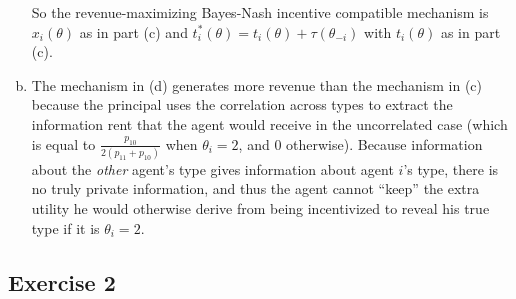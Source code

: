 \documentclass{article}
\begin{document}
\begin{enumerate}[(a)]
	So the revenue-maximizing Bayes-Nash incentive compatible mechanism is $x_i(\theta)$ as in part (c) and $t_i^*(\theta) = t_i(\theta) + \tau(\theta_{-i})$ with $t_i(\theta)$ as in part (c).

 	\item

 	The mechanism in (d) generates more revenue than the mechanism in (c) because the principal uses the correlation across types to extract the information rent that the agent would receive in the uncorrelated case (which is equal to $\frac{p_{10}}{2(p_{11} + p_{10})}$ when $\theta_i = 2$, and 0 otherwise). Because information about the \textit{other} agent's type gives information about agent $i$'s type, there is no truly private information, and thus the agent cannot ``keep'' the extra utility he would otherwise derive from being incentivized to reveal his true type if it is $\theta_i = 2$.

\end{enumerate}

\subsection*{Exercise 2}
\end{document}
